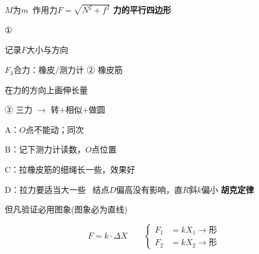 $M$为$m$\ 作用力\quad $F=\sqrt{N^2+f^2}$ %
\textbf{力的平行四边形}

①


记录$F$大小与方向

$F_3$合力：橡皮/测力计
② 橡皮筋


在力的方向上画伸长量


③ 三力 $\to$ 转$+$相似$+$做圆


A：$O$点不能动；同次\ \red{$\checkmark$}

B：记下测力计读数，$O$点位置 %

C：拉橡皮筋的细绳长一些，效果好\ \red{$\checkmark$}\quad {}

D：拉力要适当大一些\ \red{$\checkmark$}
结点$D$偏高没有影响，直$R$斜$k$偏小 %
\textbf{胡克定律}

但凡验证必用图象(图象必为直线)

\[
F=k\cdot\Delta X\qquad
\left\{
\begin{aligned}
F_1&=kX_1\to\text{形}\\
F_2&=kX_2\to\text{形}
\end{aligned}
\right.
\]

